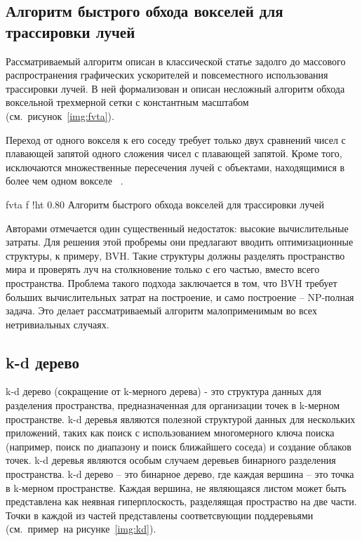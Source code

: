 \subsection{Алгоритм быстрого обхода вокселей для трассировки лучей}
Рассматриваемый алгоритм описан в классической статье задолго до массового распространения 
графических ускорителей и повсеместного использования трассировки лучей. В ней формализован и описан несложный алгоритм обхода воксельной трехмерной сетки с константным масштабом (см.~рисунок~\ref{img:fvta}).

Переход от одного вокселя к его соседу требует только двух сравнений чисел с плавающей запятой  
одного сложения чисел с плавающей запятой. Кроме того, исключаются множественные пересечения лучей с объектами, находящимися в более чем одном вокселе
~\cite{AFVTAfRT}.

    {fvta}
    {f}
    {!ht}
    {0.80\textwidth}
    {Алгоритм быстрого обхода вокселей для трассировки лучей}

Авторами отмечается один существенный недостаток: высокие вычислительные затраты. Для решения
этой пробремы они предлагают вводить оптимизационные структуры, к примеру, BVH. Такие структуры должны разделять пространство мира
и проверять луч на столкновение только с его частью, вместо всего пространства. Проблема такого 
подхода заключается в том, что BVH требует больших вычислительных затрат на построение, и
само построение -- NP-полная задача. Это делает рассматриваемый алгоритм малоприменимым во 
всех нетривиальных случаях.

\subsection{k-d дерево}

k-d дерево (сокращение от k-мерного дерева) - это структура данных 
для разделения пространства, предназначенная для организации точек в 
k-мерном пространстве. k-d деревья являются полезной структурой данных 
для нескольких приложений, таких как поиск с использованием многомерного 
ключа поиска (например, поиск по диапазону и поиск ближайшего соседа) и 
создание облаков точек. k-d деревья являются особым случаем деревьев 
бинарного разделения пространства. k-d дерево -- это бинарное дерево, где каждая 
вершина -- это точка в k-мерном пространстве. Каждая вершина, не являющаяся листом 
может быть представлена как неявная гиперплоскость, разделяящая простраство на две части.
Точки в каждой из частей представлены соответсвующии поддеревьями (см.~пример~на
рисунке~\ref{img:kd}).

